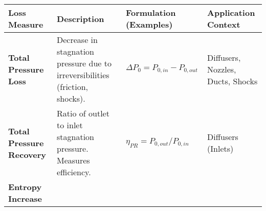 \begin{longtable}[]{@{}llll@{}}
\toprule
\begin{minipage}[b]{0.12\columnwidth}\raggedright
Loss Measure\strut
\end{minipage} & \begin{minipage}[b]{0.29\columnwidth}\raggedright
Description\strut
\end{minipage} & \begin{minipage}[b]{0.33\columnwidth}\raggedright
Formulation (Examples)\strut
\end{minipage} & \begin{minipage}[b]{0.15\columnwidth}\raggedright
Application Context\strut
\end{minipage}\tabularnewline
\midrule
\endhead
\begin{minipage}[t]{0.12\columnwidth}\raggedright
\textbf{Total Pressure Loss}\strut
\end{minipage} & \begin{minipage}[t]{0.29\columnwidth}\raggedright
Decrease in stagnation pressure due to irreversibilities (friction,
shocks).\strut
\end{minipage} & \begin{minipage}[t]{0.33\columnwidth}\raggedright
\(\Delta P_0 = P_{0,in} - P_{0,out}\)\strut
\end{minipage} & \begin{minipage}[t]{0.15\columnwidth}\raggedright
Diffusers, Nozzles, Ducts, Shocks\strut
\end{minipage}\tabularnewline
\begin{minipage}[t]{0.12\columnwidth}\raggedright
\textbf{Total Pressure Recovery}\strut
\end{minipage} & \begin{minipage}[t]{0.29\columnwidth}\raggedright
Ratio of outlet to inlet stagnation pressure. Measures efficiency.\strut
\end{minipage} & \begin{minipage}[t]{0.33\columnwidth}\raggedright
\(\eta_{PR} = P_{0,out} / P_{0,in}\)\strut
\end{minipage} & \begin{minipage}[t]{0.15\columnwidth}\raggedright
Diffusers (Inlets)\strut
\end{minipage}\tabularnewline
\begin{minipage}[t]{0.12\columnwidth}\raggedright
\textbf{Entropy Increase}\strut
\end{minipage} & \begin{minipage}[t]{0.29\columnwidth}\raggedright

\end{minipage}
\end{longtable}
